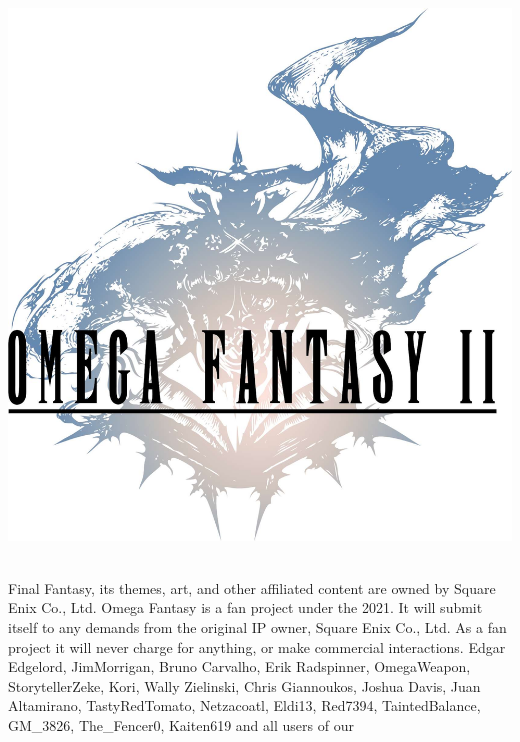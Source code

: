 \documentclass[a4paper, titlepage, 11pt, twocolumn]{article}
\begin{document}
{
\begin{titlepage}	
	\begin{center}
	\includegraphics[width=0.92\columnwidth]{./art/images/title.jpg}
	\vspace*{-0.8cm}\\
	\parbox{0.9\columnwidth}{\tableofcontents}
	\vspace*{\fill}\\
	\tiny
	Final Fantasy, its themes, art, and other affiliated content are owned by Square Enix Co., Ltd. 
	Omega Fantasy is a fan project under the \href{https://creativecommons.org/licenses/by-nc-sa/4.0/}{} 2021. 
	It will submit itself to any demands from the original IP owner, Square Enix Co., Ltd. As a fan project it will never charge for anything, or make commercial interactions.
	 Edgar Edgelord, JimMorrigan, Bruno Carvalho, Erik Radspinner, OmegaWeapon, StorytellerZeke, Kori,
	Wally Zielinski, Chris Giannoukos, Joshua Davis, Juan Altamirano, TastyRedTomato, Netzacoatl, Eldi13, Red7394, TaintedBalance, GM\_3826, The\_Fencer0, Kaiten619 and all users of our \href{https://discordapp.com/invite/F5fpxMs}{}
	\end{center}
\end{titlepage}
%
}
%
\clearpage
{}
%





















%
\end{document}
